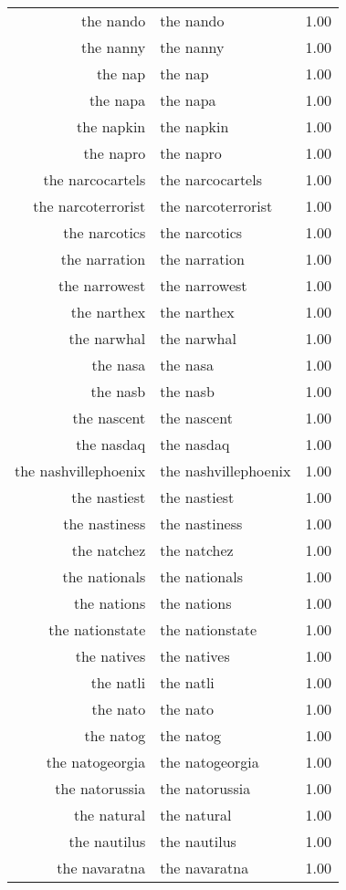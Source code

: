 \begin{table}[ht]
\begin{tabular}{rlr}
  the nando & the nando & 1.00 \\ 
  the nanny & the nanny & 1.00 \\ 
  the nap & the nap & 1.00 \\ 
  the napa & the napa & 1.00 \\ 
  the napkin & the napkin & 1.00 \\ 
  the napro & the napro & 1.00 \\ 
  the narcocartels & the narcocartels & 1.00 \\ 
  the narcoterrorist & the narcoterrorist & 1.00 \\ 
  the narcotics & the narcotics & 1.00 \\ 
  the narration & the narration & 1.00 \\ 
  the narrowest & the narrowest & 1.00 \\ 
  the narthex & the narthex & 1.00 \\ 
  the narwhal & the narwhal & 1.00 \\ 
  the nasa & the nasa & 1.00 \\ 
  the nasb & the nasb & 1.00 \\ 
  the nascent & the nascent & 1.00 \\ 
  the nasdaq & the nasdaq & 1.00 \\ 
  the nashvillephoenix & the nashvillephoenix & 1.00 \\ 
  the nastiest & the nastiest & 1.00 \\ 
  the nastiness & the nastiness & 1.00 \\ 
  the natchez & the natchez & 1.00 \\ 
  the nationals & the nationals & 1.00 \\ 
  the nations & the nations & 1.00 \\ 
  the nationstate & the nationstate & 1.00 \\ 
  the natives & the natives & 1.00 \\ 
  the natli & the natli & 1.00 \\ 
  the nato & the nato & 1.00 \\ 
  the natog & the natog & 1.00 \\ 
  the natogeorgia & the natogeorgia & 1.00 \\ 
  the natorussia & the natorussia & 1.00 \\ 
  the natural & the natural & 1.00 \\ 
  the nautilus & the nautilus & 1.00 \\ 
  the navaratna & the navaratna & 1.00 \\ 

\end{tabular}
\end{table}
